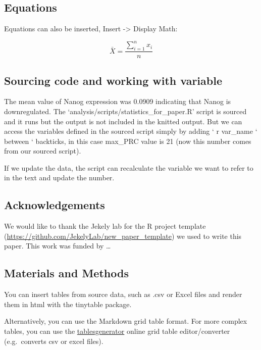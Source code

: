 \documentclass[
  11pt,
]{article}
\begin{document}
\subsection{Equations}\label{equations}

Equations can also be inserted, Insert -\textgreater{} Display Math:

\[
\bar{X} = \frac{\sum_{i=1}^{n} x_{i}}{n}
\]

\hfill\break

\subsection{Sourcing code and working with
variable}\label{sourcing-code-and-working-with-variable}

The mean value of Nanog expression was 0.0909 indicating that Nanog is
downregulated. The `analysis/scripts/statistics\_for\_paper.R' script is
sourced and it runs but the output is not included in the knitted
output. But we can access the variables defined in the sourced script
simply by adding ` r var\_name ` between ` backticks, in this case
max\_PRC value is 21 (now this number comes from our sourced script).

If we update the data, the script can recalculate the variable we want
to refer to in the text and update the number.

\subsection{Acknowledgements}\label{acknowledgements}

We would like to thank the Jekely lab for the R project template
(\url{https://github.com/JekelyLab/new_paper_template}) we used to write
this paper. This work was funded by \ldots{}

\subsection{Materials and Methods}\label{materials-and-methods}

You can insert tables from source data, such as .csv or Excel files and
render them in html with the tinytable package.

Alternatively, you can use the Markdown grid table format. For more
complex tables, you can use the
\href{https://www.tablesgenerator.com/markdown_tables}{tablesgenerator}
online grid table editor/converter (e.g.~converts csv or excel files).
\end{document}
